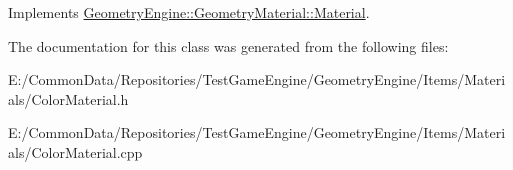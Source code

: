 Implements \mbox{\hyperlink{class_geometry_engine_1_1_geometry_material_1_1_material_a68310797df53062f237d0005fbcfce7e}{Geometry\+Engine\+::\+Geometry\+Material\+::\+Material}}.



The documentation for this class was generated from the following files\+:\begin{DoxyCompactItemize}
\item 
E\+:/\+Common\+Data/\+Repositories/\+Test\+Game\+Engine/\+Geometry\+Engine/\+Items/\+Materials/Color\+Material.\+h\item 
E\+:/\+Common\+Data/\+Repositories/\+Test\+Game\+Engine/\+Geometry\+Engine/\+Items/\+Materials/Color\+Material.\+cpp\end{DoxyCompactItemize}
